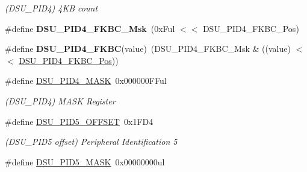 \begin{DoxyCompactItemize}
\begin{DoxyCompactList}\small\item\em (D\+S\+U\+\_\+\+P\+I\+D4) 4\+K\+B count \end{DoxyCompactList}\item 
\hypertarget{group___s_a_m_l21___d_s_u_gacf7090567b13986ca1ee4903dfbc1157}{}\#define {\bfseries D\+S\+U\+\_\+\+P\+I\+D4\+\_\+\+F\+K\+B\+C\+\_\+\+Msk}~(0x\+Ful $<$$<$ D\+S\+U\+\_\+\+P\+I\+D4\+\_\+\+F\+K\+B\+C\+\_\+\+Pos)\label{group___s_a_m_l21___d_s_u_gacf7090567b13986ca1ee4903dfbc1157}

\item 
\hypertarget{group___s_a_m_l21___d_s_u_gac37ce079f68b9fd6e3fc8b02bc876590}{}\#define {\bfseries D\+S\+U\+\_\+\+P\+I\+D4\+\_\+\+F\+K\+B\+C}(value)~(D\+S\+U\+\_\+\+P\+I\+D4\+\_\+\+F\+K\+B\+C\+\_\+\+Msk \& ((value) $<$$<$ \hyperlink{group___s_a_m_l21___d_s_u_gaa75dd4a5e3f39a78aacfe256a1db4df9}{D\+S\+U\+\_\+\+P\+I\+D4\+\_\+\+F\+K\+B\+C\+\_\+\+Pos}))\label{group___s_a_m_l21___d_s_u_gac37ce079f68b9fd6e3fc8b02bc876590}

\item 
\hypertarget{group___s_a_m_l21___d_s_u_ga4d757ce3a91f809a48fe7fbe9a72724e}{}\#define \hyperlink{group___s_a_m_l21___d_s_u_ga4d757ce3a91f809a48fe7fbe9a72724e}{D\+S\+U\+\_\+\+P\+I\+D4\+\_\+\+M\+A\+S\+K}~0x000000\+F\+Ful\label{group___s_a_m_l21___d_s_u_ga4d757ce3a91f809a48fe7fbe9a72724e}

\begin{DoxyCompactList}\small\item\em (D\+S\+U\+\_\+\+P\+I\+D4) M\+A\+S\+K Register \end{DoxyCompactList}\item 
\hypertarget{group___s_a_m_l21___d_s_u_ga55456b82aa4473e1294da9cddff8dc7f}{}\#define \hyperlink{group___s_a_m_l21___d_s_u_ga55456b82aa4473e1294da9cddff8dc7f}{D\+S\+U\+\_\+\+P\+I\+D5\+\_\+\+O\+F\+F\+S\+E\+T}~0x1\+F\+D4\label{group___s_a_m_l21___d_s_u_ga55456b82aa4473e1294da9cddff8dc7f}

\begin{DoxyCompactList}\small\item\em (D\+S\+U\+\_\+\+P\+I\+D5 offset) Peripheral Identification 5 \end{DoxyCompactList}\item 
\hypertarget{group___s_a_m_l21___d_s_u_ga5859f5a5ab794ef6639607ee21c9bfb0}{}\#define \hyperlink{group___s_a_m_l21___d_s_u_ga5859f5a5ab794ef6639607ee21c9bfb0}{D\+S\+U\+\_\+\+P\+I\+D5\+\_\+\+M\+A\+S\+K}~0x00000000ul\label{group___s_a_m_l21___d_s_u_ga5859f5a5ab794ef6639607ee21c9bfb0}


\end{DoxyCompactItemize}

